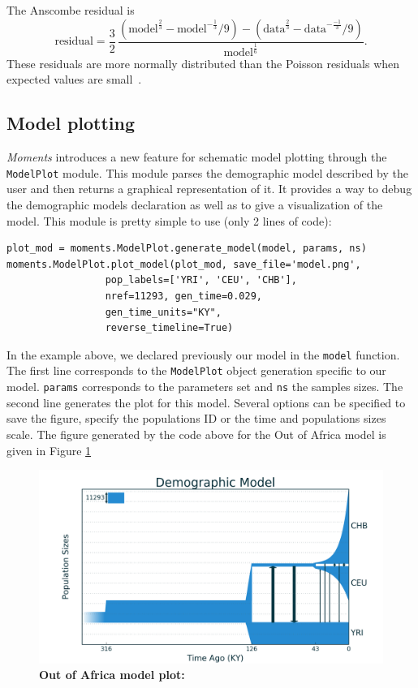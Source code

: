 \documentclass[12pt]{article}
\makeatletter
\newcommand{\py}[1]{\lstinline[breaklines=true,language=Python, showstringspaces=False]@#1@}
\makeatother
\begin{document}
The Anscombe residual is
\begin{equation}
\text{residual} = \frac{3}{2} \, \frac{(\text{model}^\frac{2}{3} - \text{model}^{-\frac{1}{3}}/9) - (\text{data}^\frac{2}{3} - \text{data}^{-\frac{-1}{3}}/9)}{\text{model}^\frac{1}{6}}.
\end{equation}
These residuals are more normally distributed than the Poisson residuals when expected values are small~\cite{bib:Pierce1986}.

\subsection{Model plotting}
\textit{Moments} introduces a new feature for schematic model plotting through the \py{ModelPlot} module. This module parses the demographic model described by the user and then returns a graphical representation of it. It provides a way to debug the demographic models declaration as well as to give a visualization of the model.
This module is pretty simple to use (only 2 lines of code):
\begin{lstlisting}
plot_mod = moments.ModelPlot.generate_model(model, params, ns)
moments.ModelPlot.plot_model(plot_mod, save_file='model.png',
			     pop_labels=['YRI', 'CEU', 'CHB'],
		 	     nref=11293, gen_time=0.029,
			     gen_time_units="KY", 
			     reverse_timeline=True)
\end{lstlisting}
In the example above, we declared previously our model in the \py{model} function. The first line corresponds to the \py{ModelPlot} object generation specific to our model. \py{params} corresponds to the parameters set and \py{ns} the samples sizes. The second line generates the plot for this model. Several options can be specified to save the figure, specify the populations ID or the time and populations sizes scale.
The figure generated by the code above for the Out of Africa model is given in Figure \ref{fig:model_plot}

\begin{figure}
\centering
\includegraphics[scale=0.5]{model.png}
\caption{\textbf{Out of Africa model plot:}\label{fig:model_plot}}
\end{figure}
\end{document}
